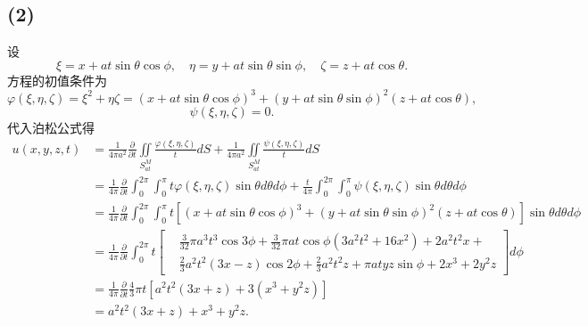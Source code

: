 \documentclass[11pt,a4paper]{article}
\begin{document}
\subsection*{(2)}
设
$$\xi=x+at\sin\theta\cos\phi,\quad \eta=y+at\sin\theta\sin\phi,\quad \zeta=z+at\cos\theta.$$
方程的初值条件为
$$\varphi(\xi,\eta,\zeta)=\xi^2+\eta\zeta=(x+at\sin\theta\cos\phi)^3+(y+at\sin\theta\sin\phi)^2(z+at\cos\theta),$$
$$\psi(\xi,\eta,\zeta)=0.$$
代入泊松公式得
\begin{align*}
  u(x,y,z,t)
   & =\frac{1}{4\pi a^2}\frac{\partial}{\partial t}\iint\limits_{S_{at}^M}\frac{\varphi(\xi,\eta,\zeta)}{t}dS+\frac{1}{4\pi a^2}\iint\limits_{S_{at}^M}\frac{\psi(\xi,\eta,\zeta)}{t}dS                    \\
   & =\frac{1}{4\pi}\frac{\partial}{\partial t}\int_0^{2\pi}\int_0^\pi t\varphi(\xi,\eta,\zeta)\sin\theta d\theta d\phi+\frac{t}{4\pi}\int_0^{2\pi}\int_0^\pi \psi(\xi,\eta,\zeta)\sin\theta d\theta d\phi \\
   & =\frac{1}{4\pi}\frac{\partial}{\partial t}\int_0^{2\pi}\int_0^\pi t[(x+at\sin\theta\cos\phi)^3+(y+at\sin\theta\sin\phi)^2(z+at\cos\theta)]\sin\theta d\theta d\phi                                    \\
   & =\frac{1}{4\pi}\frac{\partial}{\partial t}\int_0^{2\pi}t \left[\begin{aligned}
       & \frac{3}{32} \pi  a^3 t^3 \cos 3 \phi +\frac{3}{32} \pi  a t \cos \phi  \left(3 a^2 t^2+16 x^2\right)+ 2 a^2 t^2 x+ \\
       & \frac{2}{3} a^2 t^2 (3 x-z) \cos 2 \phi +\frac{2}{3} a^2 t^2 z+\pi  a t y z \sin \phi +2 x^3+2 y^2 z\end{aligned}
    \right]d\phi                                                                                                                                                                                           \\
   & =\frac{1}{4\pi}\frac{\partial}{\partial t}\frac{4}{3} \pi  t \left[a^2 t^2 (3 x+z)+3 \left(x^3+y^2 z\right)\right]                                                                                    \\
   & =a^2 t^2 (3 x+z)+x^3+y^2 z.
\end{align*}
\end{document}
